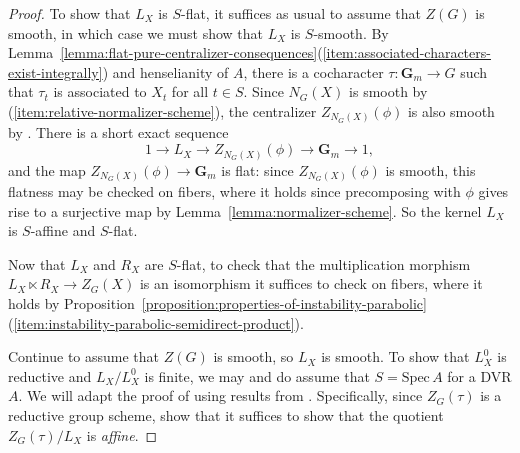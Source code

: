 \documentclass[11pt,reqno]{amsart}
\theoremstyle{definition}
\newcommand{\Spec}{\mathrm{Spec} \,}
\newcommand{\bG}{{\mathbf G}}
\begin{document}
\begin{proof}
To show that $L_X$ is $S$-flat, it suffices as usual to assume that $Z(G)$ is smooth, in which case we must show that $L_X$ is $S$-smooth. By Lemma~\ref{lemma:flat-pure-centralizer-consequences}(\ref{item:associated-characters-exist-integrally}) and henselianity of $A$, there is a cocharacter $\tau: \bG_m \to G$ such that $\tau_t$ is associated to $X_t$ for all $t \in S$. Since $N_G(X)$ is smooth by (\ref{item:relative-normalizer-scheme}), the centralizer $Z_{N_G(X)}(\phi)$ is also smooth by \cite[Lem.\ 2.2.4]{Conrad}. There is a short exact sequence
\[
1 \to L_X \to Z_{N_G(X)}(\phi) \to \bG_m \to 1,
\]
and the map $Z_{N_G(X)}(\phi) \to \bG_m$ is flat: since $Z_{N_G(X)}(\phi)$ is smooth, this flatness may be checked on fibers, where it holds since precomposing with $\phi$ gives rise to a surjective map by Lemma~\ref{lemma:normalizer-scheme}. So the kernel $L_X$ is $S$-affine and $S$-flat. \smallskip

Now that $L_X$ and $R_X$ are $S$-flat, to check that the multiplication morphism $L_X \ltimes R_X \to Z_G(X)$ is an isomorphism it suffices to check on fibers, where it holds by Proposition~\ref{proposition:properties-of-instability-parabolic}(\ref{item:instability-parabolic-semidirect-product}). \smallskip

Continue to assume that $Z(G)$ is smooth, so $L_X$ is smooth. To show that $L_X^0$ is reductive and $L_X/L_X^0$ is finite, we may and do assume that $S = \Spec A$ for a DVR $A$. We will adapt the proof of \cite[Thm.\ 2.3(iii)]{Premet} using results from \cite{Alper-adequate}. Specifically, since $Z_G(\tau)$ is a reductive group scheme, \cite[Thms.\ 9.4.1 and 9.7.6]{Alper-adequate} show that it suffices to show that the quotient $Z_G(\tau)/L_X$ is \textit{affine}. \smallskip


\end{proof}
\end{document}
